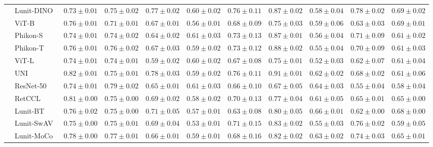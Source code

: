 \begin{tabular}{ll|cccc|c|cccc}
 & Lunit-DINO~\cite{kang2023benchmarking} & $0.73 \pm 0.01$ & $0.75 \pm 0.02$ & $0.77 \pm 0.02$ & $0.60 \pm 0.02$ & $0.76 \pm 0.11$ & $0.87 \pm 0.02$ & $0.58 \pm 0.04$ & $\mathbf{0.78 \pm 0.02}$ & $0.69 \pm 0.02$ \\
 & ViT-B~\cite{kolesnikov2021image} & $0.76 \pm 0.01$ & $0.71 \pm 0.01$ & $0.67 \pm 0.01$ & $0.56 \pm 0.01$ & $0.68 \pm 0.09$ & $0.75 \pm 0.03$ & $0.59 \pm 0.06$ & $0.63 \pm 0.03$ & $\mathbf{0.69 \pm 0.01}$ \\
 & Phikon-S~\cite{filiot2023scaling} & $0.74 \pm 0.01$ & $0.74 \pm 0.02$ & $0.64 \pm 0.02$ & $0.61 \pm 0.03$ & $0.73 \pm 0.13$ & $0.87 \pm 0.01$ & $0.56 \pm 0.04$ & $0.71 \pm 0.09$ & $0.61 \pm 0.02$ \\
 & Phikon-T~\cite{filiot2023scaling} & $0.76 \pm 0.01$ & $0.76 \pm 0.02$ & $0.67 \pm 0.03$ & $0.59 \pm 0.02$ & $0.73 \pm 0.12$ & $0.88 \pm 0.02$ & $0.55 \pm 0.04$ & $0.70 \pm 0.09$ & $0.61 \pm 0.03$ \\
 & ViT-L~\cite{kolesnikov2021image} & $0.74 \pm 0.01$ & $0.74 \pm 0.01$ & $0.59 \pm 0.02$ & $0.60 \pm 0.02$ & $0.67 \pm 0.08$ & $0.75 \pm 0.01$ & $0.52 \pm 0.03$ & $0.62 \pm 0.07$ & $0.61 \pm 0.04$ \\
 & UNI~\cite{chen2024uni} & $\mathbf{0.82 \pm 0.01}$ & $0.75 \pm 0.01$ & $\mathbf{0.78 \pm 0.03}$ & $0.59 \pm 0.02$ & $\mathbf{0.76 \pm 0.11}$ & $\mathbf{0.91 \pm 0.01}$ & $0.62 \pm 0.02$ & $0.68 \pm 0.02$ & $0.61 \pm 0.06$ \\
 & ResNet-50~\cite{he2015deep} & $0.74 \pm 0.01$ & $\mathbf{0.79 \pm 0.02}$ & $0.65 \pm 0.01$ & $0.61 \pm 0.03$ & $0.66 \pm 0.10$ & $0.67 \pm 0.05$ & $0.64 \pm 0.03$ & $0.55 \pm 0.04$ & $0.58 \pm 0.04$ \\
 & RetCCL~\cite{wang2023retccl} & $0.81 \pm 0.00$ & $0.75 \pm 0.00$ & $0.69 \pm 0.02$ & $0.58 \pm 0.02$ & $0.70 \pm 0.13$ & $0.77 \pm 0.04$ & $0.61 \pm 0.05$ & $0.65 \pm 0.01$ & $0.65 \pm 0.00$ \\
 & Lunit-BT~\cite{kang2023benchmarking} & $0.76 \pm 0.02$ & $0.75 \pm 0.00$ & $0.71 \pm 0.05$ & $0.57 \pm 0.01$ & $0.63 \pm 0.08$ & $0.80 \pm 0.05$ & $0.66 \pm 0.01$ & $0.62 \pm 0.00$ & $0.68 \pm 0.00$ \\
 & Lunit-SwAV~\cite{kang2023benchmarking} & $0.75 \pm 0.00$ & $0.75 \pm 0.01$ & $0.69 \pm 0.04$ & $0.53 \pm 0.01$ & $0.71 \pm 0.15$ & $0.83 \pm 0.02$ & $0.55 \pm 0.03$ & $0.76 \pm 0.02$ & $0.59 \pm 0.05$ \\
 & Lunit-MoCo~\cite{kang2023benchmarking} & $0.78 \pm 0.00$ & $0.77 \pm 0.01$ & $0.66 \pm 0.01$ & $0.59 \pm 0.01$ & $0.68 \pm 0.16$ & $0.82 \pm 0.02$ & $0.63 \pm 0.02$ & $0.74 \pm 0.03$ & $0.65 \pm 0.01$ \\
\cline{1-11}
\bottomrule
\end{tabular}
